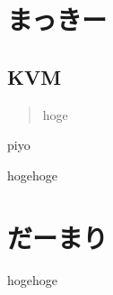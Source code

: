 \documentclass[9pt,b5paper,tombo]{jsbook}
\begin{document}
\section{まっきー}

\subsection{KVM}

\begin{quote}
hoge
\end{quote}

\begin{flushright}
piyo
\end{flushright}

hogehoge

\section{だーまり}

hogehoge

\newpage


\enlargethispage{\paperwidth}
\thispagestyle{empty}
\vspace*{-1truein}
\vspace*{-\topmargin}
\vspace*{-\headheight}
\vspace*{-\headsep}
\vspace*{-\topskip}
\noindent\hspace*{-1in}\hspace*{-\oddsidemargin}
\end{document}
